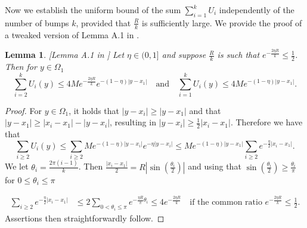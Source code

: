 \documentclass[a4paper,11pt]{article}
\newtheorem{lemma}{Lemma}[section]
\theoremstyle{remark}
\begin{document}
Now we establish the uniform bound of the sum $\displaystyle \sum_{i=1}^k U_i$ independently of the number of bumps $k$, provided that $\frac{R}{k}$ is sufficiently large. We provide the proof of a tweaked version of Lemma A.1 in \cite{wei_yan_2014}.
\begin{lemma}\label{ksum}[Lemma A.1 in \cite{wei_yan_2014}] Let $\eta \in (0,1]$ and suppose $\frac{R}{k}$ is such that $e^{-\frac{2\eta R}{k}} \le \frac{1}{2}$. Then for $y \in{\Omega}_1$
$$\displaystyle \sum_{i=2}^k U_i(y) \le 4Me^{-\frac{2\eta R}{k}} e^{-(1-\eta)|y-x_1|} \quad\text{and} \quad \displaystyle \sum_{i=1}^k U_i(y) \le 4Me^{-(1-\eta)|y-x_1|}.$$
 \end{lemma}
\begin{proof}

For $y\in \Omega_1$, it holds that $|y-x_i|\ge |y-x_1|$ and that $|y-x_1| \ge |x_i-x_1|-|y-x_i|$, resulting in $|y-x_i|\ge \frac{1}{2}|x_i-x_1|$. Therefore we have that
$$\sum_{i\ge 2} U_i(y) \le \sum_{i\ge 2} Me^{-(1-\eta)|y-x_i|} e^{-\eta|y-x_i|}
\le Me^{-(1-\eta)|y-x_1|}\sum_{i\ge 2} e^{-\frac{\eta}{2}|x_i-x_1|} .$$
We let $\theta_i = \frac{2\pi(i-1)}{k}$. Then $ \frac{|x_i-x_1|}{2} = R\left|\sin\left(\frac{\theta_i}{2}\right)\right|$ and using that $ \sin\left(\frac{\theta_i}{2}\right) \ge \frac{\theta_i}{\pi}$ for $0\le\theta_i \le \pi$

\begin{align*}
 \sum_{i\ge 2} e^{-\frac{\eta}{2}|x_i-x_1|} &\le 2\sum_{0<\theta_i \le \pi} e^{-\frac{\eta R}{\pi}\theta_i} \le 4 e^{-\frac{2\eta R}{k}} \quad \text{if the common ratio $e^{-\frac{2\eta R}{k}} \le \frac{1}{2}$}.
\end{align*}
Assertions then straightforwardly follow.
 \end{proof}
\end{document}
